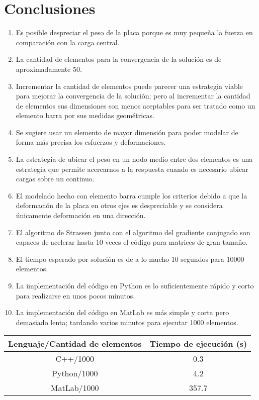 \documentclass[12pt,a3paper]{article}
\begin{document}
\section{Conclusiones}
\begin{enumerate}
\item Es posible despreciar el peso de la placa porque es muy pequeña la fuerza en comparación con la carga central.
\item La cantidad de elementos para la convergencia de la solución es de aproximadamente 50.
\item Incrementar la cantidad de elementos puede parecer una estrategia viable para mejorar la convergencia de la solución; pero al incrementar la cantidad de elementos sus dimensiones son menos aceptables para ser tratado como un elemento barra por sus medidas geométricas.
\item Se sugiere usar un elemento de mayor dimensión para poder modelar de forma más precisa los esfuerzos y deformaciones.
\item La estrategia de ubicar el peso en un nodo medio entre dos elementos es una estrategia que permite acercarnos a la respuesta cuando es necesario ubicar cargas sobre un continuo.
\item El modelado hecho con elemento barra cumple los criterios debido a que la deformación de la placa en otros ejes es despreciable y se considera únicamente deformación en una dirección.
\item El algoritmo de Strassen junto con el algoritmo del gradiente conjugado son capaces de acelerar hasta 10 veces el código para matrices de gran tamaño.
\item El tiempo esperado por solución es de a lo mucho 10 segundos para 10000 elementos.
\item La implementación del código en Python es lo suficientemente rápido y corto para realizarse en unos pocos minutos.
\item La implementación del código en MatLab es más simple y corta pero demasiado lenta; tardando varios minutos para ejecutar 1000 elementos.
\end{enumerate}
\begin{center}
\begin{tabular}{|c|c|}
\hline 
Lenguaje/Cantidad de elementos & Tiempo de ejecución (s) \\ 
\hline 
C++/1000 & 0.3 \\ 
\hline 
Python/1000 & 4.2 \\ 
\hline 
MatLab/1000 & 357.7 \\ 
\hline 
\end{tabular} 
\end{center}
\end{document}
